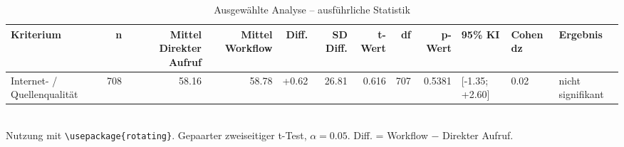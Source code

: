 \begin{table}
\centering
\caption{Ausgewählte Analyse -- ausführliche Statistik}
\begin{tabular}{lrrrrrrrrlll}
\toprule
Kriterium & n & Mittel Direkter Aufruf & Mittel Workflow & Diff. & SD Diff. & t-Wert & df & p-Wert & 95\% KI & Cohen dz & Ergebnis \\
\midrule
Internet- / Quellenqualität & 708 & 58.16 & 58.78 & +0.62 & 26.81 & 0.616 & 707 & 0.5381 & [-1.35; +2.60] & 0.02 & nicht signifikant \\
\bottomrule
\end{tabular}
\\[2mm]
\footnotesize Nutzung mit \texttt{\textbackslash usepackage\{rotating\}}. Gepaarter zweiseitiger t-Test, $\alpha=0.05$. Diff. = Workflow $-$ Direkter Aufruf.
\end{table}
